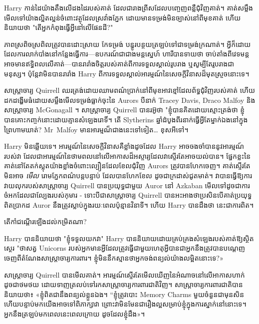 \later

Harry កាន់​ដៃ​យ៉ាង​តឹង​លើ​ដង​ដៃ​របស់​គាត់ ដែល​ជា​រាង​ព្រីស​ដែល​បញ្ចេញ​ពន្លឺ​ជុំវិញ​គាត់។ គាត់​សម្លឹង​មើល​ទៅ​យ៉ាង​ល្អិតល្អន់​ចំពោះ​វត្ថុ​ដែល​ស្រវាំង​ភ្នែក ដោយ​មាន​ទម្រង់​មិន​ច្បាស់​នៅ​ពី​មុខ​គាត់ ហើយ​និយាយ​ថា "តើ​អ្នក​កំពុង​ធ្វើ​អ្វី​នៅ​លើ​ផែនដី?"

ភាពស្រពិចស្រពិលត្រូវបានដោះស្រាយ កែទម្រង់ បន្ធូរបន្ថយត្រឡប់ទៅជាទម្រង់ក្រណាត់។ អ្វីក៏ដោយដែលការលាក់បាំងនៅកន្លែងធ្វើការ—ឧបករណ៍ជាជាងមន្តស្នេហ៍ ហារីបានទាយថា ចាប់តាំងពីវេទមន្តអាចមានឥទ្ធិពលលើគាត់—បានរារាំងចិត្តរបស់គាត់ពីការទទួលស្គាល់រូបរាង ឬសូម្បីតែរូបរាងជាមនុស្ស។ ប៉ុន្តែ​វា​មិន​បាន​រារាំង Harry ពី​ការ​ទទួល​ស្គាល់​អារម្មណ៍​នៃ​សេចក្ដី​វិនាស​ដ៏​មុត​ស្រួច​នោះ​ទេ។

សាស្ត្រាចារ្យ Quirrell ឈរត្រង់ដោយឈាមពណ៌ប្រាក់នៅពីមុខអាវខ្មៅដែលព័ទ្ធជុំវិញរបស់គាត់ ហើយដកដង្ហើមធំដោយសម្លឹងមើលទម្រង់ធ្លាក់ចុះនៃ Aurors បីនាក់ Tracey Davis, Draco Malfoy និងសាស្រ្តាចារ្យ McGonagall ។ សាស្ត្រាចារ្យ Quirrell បានរអ៊ូថា "ខ្ញុំបានគិតដោយស្មោះត្រង់ថា ខ្ញុំបានគោះកញ្ចក់នោះដោយគ្មានសំឡេងរោទិ៍។ តើ Slytherins ឆ្នាំដំបូងពីរនាក់ធ្វើអ្វីតែម្នាក់ឯងនៅក្នុងព្រៃហាមឃាត់? Mr~Malfoy មានអារម្មណ៏ជាងនេះទៅទៀត… ខុសអីទៅ។

Harry មិនឆ្លើយទេ។ អារម្មណ៍នៃសេចក្តីវិនាសគឺខ្លាំងដូចដែល Harry អាចចងចាំបាននូវអារម្មណ៍របស់វា ដែលជាអារម្មណ៍នៃថាមពលនៅលើអាកាសដ៏អស្ចារ្យដែលវាស្ទើរតែអាចយល់បាន។ ផ្នែកខ្លះនៃគាត់នៅតែតក់ស្លុតយ៉ាងខ្លាំងចំពោះល្បឿនដែលខែលជុំវិញ Aurors ត្រូវបានហែកចេញ។ គាត់ស្ទើរតែមិនអាច \emph{មើល} រោមភ្នែកពណ៌បន្តបន្ទាប់ ដែលបានហែកខែល ដូចជាក្រដាស់ជូតមាត់។ វាបានធ្វើឱ្យការវាយលុករបស់សាស្រ្តាចារ្យ Quirrell បានប្រយុទ្ធជាមួយ Auror នៅ Azkaban មើលទៅដូចជាការចំអកដែលជាល្បែងរបស់កុមារ - ទោះបីជាសាស្រ្តាចារ្យ Quirrell បានអះអាងថាប្រសិនបើគាត់ប្រយុទ្ធពិតប្រាកដ Auror នឹងត្រូវស្លាប់ក្នុងរយៈពេលប៉ុន្មានវិនាទី។ ហើយ Harry បានដឹងថា នេះជាការពិត។

តើកាំជណ្ដើរឡើងដល់កម្រិតណា?

Harry បាននិយាយថា "ខ្ញុំទទួលយកវា" Harry បាននិយាយដោយគ្រប់គ្រងសំឡេងរបស់គាត់ឱ្យស្ថិតស្ថេរ "ថាសត្វ Unicorns របស់អ្នកមានអ្វីដែលត្រូវធ្វើជាមួយហេតុអ្វីបានជាអ្នកនឹងត្រូវបានបណ្តេញចេញពីតំណែងសាស្រ្តាចារ្យការពារ។ ខ្ញុំ​មិន​នឹក​ស្មាន​ថា​អ្នក​ចង់​ពន្យល់​យ៉ាង​លម្អិត​នោះ​ទេ?»

សាស្រ្តាចារ្យ Quirrell បានមើលគាត់។ អារម្មណ៍ស្ទើរតែមើលឃើញនៃអំណាចនៅលើអាកាសហាក់ដូចជាថមថយ ដោយទាញត្រលប់ទៅរកសាស្រ្តាចារ្យការពារជាតិវិញ។ សាស្ត្រាចារ្យ​ការពារ​ជាតិ​បាន​និយាយ​ថា​៖ «​ខ្ញុំ​ពិតជា​នឹង​ពន្យល់​ខ្លួនឯង​។ “ខ្ញុំត្រូវបោះ Memory Charms មួយចំនួនជាមុនសិន ហើយបន្ទាប់មកយើងអាចទៅពិភាក្សាវា ព្រោះវាមិនមែនជារឿងល្អសម្រាប់ខ្ញុំក្នុងការស្នាក់នៅនោះទេ។ អ្នក​នឹង​ត្រឡប់​មក​ពេល​នេះ​ពេល​ក្រោយ ដូច​ដែល​ខ្ញុំ​ដឹង»។

